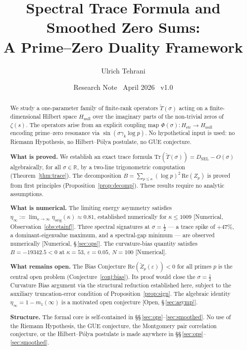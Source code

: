\documentclass[11pt]{article}
\title{\vspace{-1.5em}\bfseries Spectral Trace Formula and Smoothed Zero Sums:\\[0.4em]
\large A Prime--Zero Duality Framework}
\author{Ulrich Tehrani}
\date{Research Note \textperiodcentered\ April 2026
      \textperiodcentered\ v1.0}
\newcommand{\Hstr}{H_{\mathrm{str}}}
\newcommand{\Hnull}{H_{\mathrm{null}}}
\newcommand{\etaorig}{\eta_{\mathrm{orig}}}
\newcommand{\Tt}{\widetilde{T}}
\newcommand{\Zt}{\widetilde{Z}}
\newcommand{\DSEL}{D_{\mathrm{SEL}}}
\begin{document}
\maketitle

\begin{abstract}
We study a one-parameter family of finite-rank operators $\Tt(\sigma)$
acting on a finite-dimensional Hilbert space $\Hnull$ over the imaginary
parts of the non-trivial zeros of $\zeta(s)$.
The operators arise from an explicit coupling map
$\Phi(\sigma)\colon\Hstr\to\Hnull$ encoding prime--zero resonance
via $\sin(\sigma\gamma_k\log p)$.
No hypothetical input is used: no Riemann Hypothesis, no Hilbert--P\'olya
postulate, no GUE conjecture.

\textbf{What is proved.}
We establish an exact trace formula
$\mathrm{Tr}(\Tt(\sigma)) = \DSEL - O(\sigma)$
algebraically, for all $\sigma\in\mathbb{R}$, by a two-line
trigonometric computation (Theorem~\ref{thm:trace}).
The decomposition $B = \sum_{p\leq\kappa}(\log p)^2\,\mathrm{Re}(Z_p)$
is proved from first principles (Proposition~\ref{prop:decomp}).
These results require no analytic assumptions.

\textbf{What is numerical.}
The limiting energy asymmetry satisfies
$\eta_\infty := \lim_{\kappa\to\infty}\etaorig(\kappa)\approx 0.81$,
established numerically for $\kappa\leq 1009$ [Numerical,
Observation~\ref{obs:etainf}].
Three spectral signatures at $\sigma=\tfrac{1}{2}$ --- a trace spike
of $+47\%$, a dominant-eigenvalue maximum, and a spectral-gap minimum
--- are observed numerically [Numerical, \S\,\ref{sec:ops}].
The curvature-bias quantity satisfies $B = -19342.5 < 0$
at $\kappa=53$, $\varepsilon=0.05$, $N=100$ [Numerical].

\textbf{What remains open.}
The Bias Conjecture $\mathrm{Re}(\Zt_p(\varepsilon))<0$
for all primes $p$ is the central open problem (Conjecture~\ref{conj:bias}).
Its proof would close the $\sigma=\tfrac{1}{2}$ Curvature Bias argument
via the structural reduction established here,
subject to the auxiliary truncation-error condition of
Proposition~\ref{prop:sign}.
The algebraic identity $\eta_\infty = 1 - m_1(\infty)$ is a motivated
open conjecture [Open, \S\,\ref{sec:asymp}].

\textbf{Structure.}
The formal core is self-contained in \S\S\,\ref{sec:ops}--\ref{sec:smoothed}.
No use of the Riemann Hypothesis, the GUE conjecture,
the Montgomery pair correlation conjecture, or the Hilbert--P\'olya
postulate is made anywhere in \S\S\,\ref{sec:ops}--\ref{sec:smoothed}.
\end{abstract}
\end{document}
